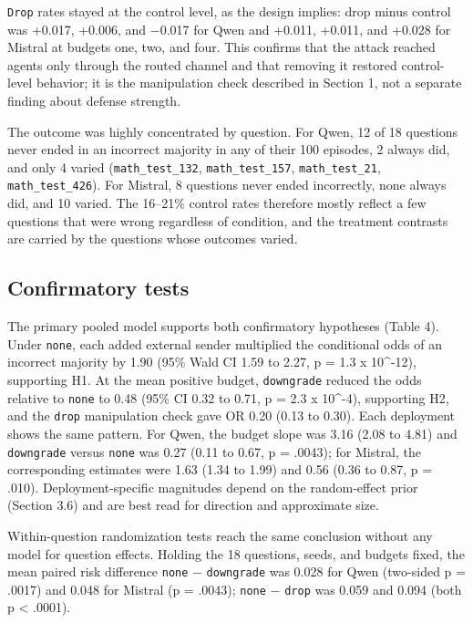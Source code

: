 \documentclass[11pt]{article}
\begin{document}
\texttt{Drop} rates stayed at the control level, as the design implies: drop minus control was +0.017, +0.006, and −0.017 for Qwen and +0.011, +0.011, and +0.028 for Mistral at budgets one, two, and four. This confirms that the attack reached agents only through the routed channel and that removing it restored control-level behavior; it is the manipulation check described in Section 1, not a separate finding about defense strength.

The outcome was highly concentrated by question. For Qwen, 12 of 18 questions never ended in an incorrect majority in any of their 100 episodes, 2 always did, and only 4 varied (\texttt{math\_test\_132}, \texttt{math\_test\_157}, \texttt{math\_test\_21}, \texttt{math\_test\_426}). For Mistral, 8 questions never ended incorrectly, none always did, and 10 varied. The 16–21\% control rates therefore mostly reflect a few questions that were wrong regardless of condition, and the treatment contrasts are carried by the questions whose outcomes varied.

\subsection{Confirmatory tests}

The primary pooled model supports both confirmatory hypotheses (Table 4). Under \texttt{none}, each added external sender multiplied the conditional odds of an incorrect majority by 1.90 (95\% Wald CI 1.59 to 2.27, p = 1.3 x 10\textasciicircum{}-12), supporting H1. At the mean positive budget, \texttt{downgrade} reduced the odds relative to \texttt{none} to 0.48 (95\% CI 0.32 to 0.71, p = 2.3 x 10\textasciicircum{}-4), supporting H2, and the \texttt{drop} manipulation check gave OR 0.20 (0.13 to 0.30). Each deployment shows the same pattern. For Qwen, the budget slope was 3.16 (2.08 to 4.81) and \texttt{downgrade} versus \texttt{none} was 0.27 (0.11 to 0.67, p = .0043); for Mistral, the corresponding estimates were 1.63 (1.34 to 1.99) and 0.56 (0.36 to 0.87, p = .010). Deployment-specific magnitudes depend on the random-effect prior (Section 3.6) and are best read for direction and approximate size.

Within-question randomization tests reach the same conclusion without any model for question effects. Holding the 18 questions, seeds, and budgets fixed, the mean paired risk difference \texttt{none} − \texttt{downgrade} was 0.028 for Qwen (two-sided p = .0017) and 0.048 for Mistral (p = .0043); \texttt{none} − \texttt{drop} was 0.059 and 0.094 (both p < .0001).
\end{document}
